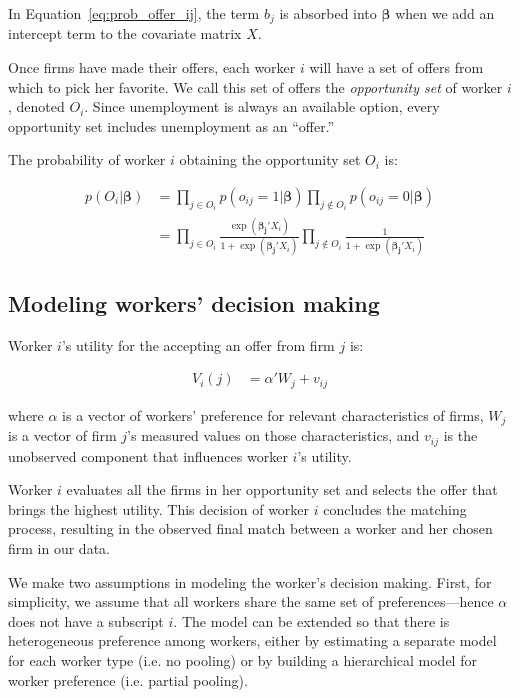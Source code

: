 In Equation~\eqref{eq:prob_offer_ij}, the term $b_j$ is absorbed into
$\bm{\beta}$ when we add an intercept term to the covariate matrix $X$.

Once firms have made their offers, each worker $i$ will have a set of offers
from which to pick her favorite. We call this set of offers the
\textit{opportunity set} of worker $i$, denoted $O_i$. Since unemployment is
always an available option, every opportunity set includes unemployment as an
``offer.''

The probability of worker $i$ obtaining the opportunity set $O_i$ is:

\begin{align}
  p(O_i | \bm{\beta}) &= \prod_{j \in O_i} p(o_{ij} = 1 | \bm{\beta}) \prod_{j \notin O_i} p(o_{ij} = 0 | \bm{\beta}) \\
                      &= \prod_{j \in O_i} \frac{\exp(\bm{\beta_j} ' X_i)}{1 + \exp(\bm{\beta_j}' X_i)}
                        \prod_{j \notin O_i} \frac{1}{1 + \exp(\bm{\beta_j}' X_i)} \label{eq:conditional_probability_of_offer}
\end{align}

\subsection{Modeling workers' decision making}

Worker $i$'s utility for the accepting an offer from firm $j$ is:

\begin{align}
  V_i(j) &= \alpha' W_{j} + v_{ij}
\end{align}

where $\alpha$ is a vector of workers' preference for relevant characteristics
of firms, $W_j$ is a vector of firm $j$'s measured values on those
characteristics, and $v_{ij}$ is the unobserved component that influences worker
$i$'s utility.

Worker $i$ evaluates all the firms in her opportunity set and selects the offer
that brings the highest utility. This decision of worker $i$ concludes the
matching process, resulting in the observed final match between a worker and her
chosen firm in our data.

We make two assumptions in modeling the worker's decision making. First, for
simplicity, we assume that all workers share the same set of preferences---hence
$\alpha$ does not have a subscript $i$. The model can be extended so that there
is heterogeneous preference among workers, either by estimating a separate model
for each worker type (i.e. no pooling) or by building a hierarchical model for
worker preference (i.e. partial pooling).

